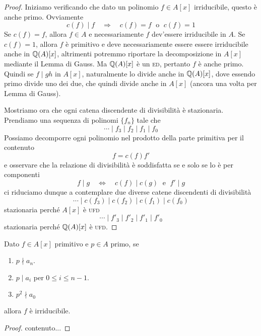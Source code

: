 \begin{multicols}{2}
\begin{proof}
	
	Iniziamo verificando che dato un polinomio $ f \in A[x] $ irriducibile, questo è anche primo. Ovviamente 
	\[ c(f) \mid f \quad\Rightarrow\quad c(f) = f \;\text{ o }\; c(f) = 1 \]
	Se $ c(f) = f $, allora $ f \in A $ e necessariamente $ f $ dev'essere irriducibile in $ A $.
	Se $ c(f) = 1 $, allora $ f $ è primitivo e deve necessariamente essere essere irriducibile anche in $ \mathbb{Q}(A)[x] $, altrimenti potremmo riportare la decomposizione in $ A[x] $ mediante il Lemma di Gauss. Ma $ \mathbb{Q}(A)[x] $ è un \textsc{ed}, pertanto $ f $ è anche primo. Quindi se $ f \mid gh $ in $ A[x] $, naturalmente lo divide anche in $ \mathbb{Q}(A)[x] $, dove essendo primo divide uno dei due, che quindi divide anche in $ A[x] $ (ancora una volta per Lemma di Gauss).
	
	
	Mostriamo ora che ogni catena discendente di divisibilità è stazionaria. Prendiamo una sequenza di polinomi $ \{ f_n \} $ tale che
	\[ \cdots \mid f_3 \mid f_2 \mid f_1 \mid f_0 \]
	Possiamo decomporre ogni polinomio nel prodotto della parte primitiva per il contenuto
	\[ f = c(f)f' \]
	e osservare che la relazione di divisibilità è soddisfatta se e solo se lo è per componenti
	\[ f \mid g \quad\Leftrightarrow\quad c(f) \mid c(g) \;\text{ e }\; f' \mid g \]
	ci riduciamo dunque a contemplare due diverse catene discendenti di divisibilità
	\[ \cdots \mid c(f_3) \mid c(f_2) \mid c(f_1) \mid c(f_0) \]
	stazionaria perché  $ A[x] $ è \textsc{ufd}
	\[ \cdots \mid f'_3 \mid f'_2 \mid f'_1 \mid f'_0 \]
	stazionaria perché  $ \mathbb{Q}(A)[x] $ è \textsc{ufd}.
\end{proof}



\begin{theorem}
	Dato $ f \in A[x] $ primitivo e $ p \in A $ primo, se
	\begin{enumerate}
		\item  $ p \nmid a_n $.
		\item $ p \mid a_i $ per $ 0\leq i\leq n-1  $.
		\item $ p^2 \nmid a_0 $
	\end{enumerate}
	allora $ f $ è irriducibile.
\end{theorem}
\begin{proof}
	contenuto...
\end{proof}


\end{multicols}
